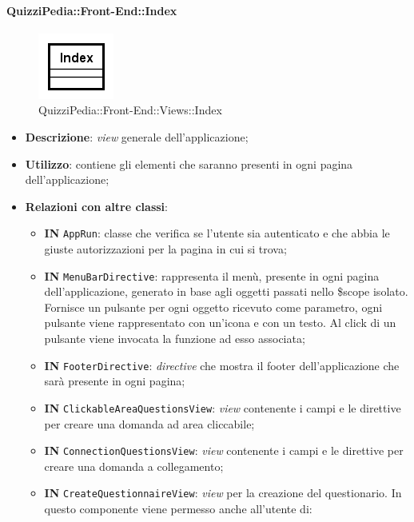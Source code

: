	
	\paragraph{QuizziPedia::Front-End::Index}
	\begin{figure} [ht]
		\centering
		\includegraphics[scale=0.80]{UML/Classi/Front-End/QuizziPedia_Front-end_Views_Index.png}
		\caption{QuizziPedia::Front-End::Views::Index}
	\end{figure} \FloatBarrier
	\begin{itemize}
		\item \textbf{Descrizione}: \textit{view} generale dell'applicazione;
		\item \textbf{Utilizzo}: contiene gli elementi che saranno presenti in ogni pagina dell'applicazione;
		\item \textbf{Relazioni con altre classi}:
		\begin{itemize}
			\item \textbf{IN} \texttt{AppRun}: classe che verifica se l'utente sia autenticato e che abbia le giuste autorizzazioni per la pagina in cui si trova;
			\item \textbf{IN} \texttt{MenuBarDirective}: rappresenta il menù, presente in ogni pagina dell'applicazione, generato in base agli oggetti passati nello \$scope isolato. Fornisce un pulsante per ogni oggetto ricevuto come parametro, ogni pulsante viene rappresentato con un’icona e con un testo. Al click di un pulsante viene invocata la funzione ad esso associata;
			\item \textbf{IN} \texttt{FooterDirective}: \textit{directive} che mostra il footer dell'applicazione che sarà presente in ogni pagina;
			\item \textbf{IN} \texttt{ClickableAreaQuestionsView}: \textit{view} contenente i campi e le direttive per creare una domanda ad area cliccabile;
			\item \textbf{IN} \texttt{ConnectionQuestionsView}: \textit{view} contenente i campi e le direttive per creare una domanda a collegamento;
			\item \textbf{IN} \texttt{CreateQuestionnaireView}: \textit{view} per la creazione del questionario. In questo componente viene permesso anche all'utente di:
			\begin{itemize}

\end{itemize}
\end{itemize}
\end{itemize}
